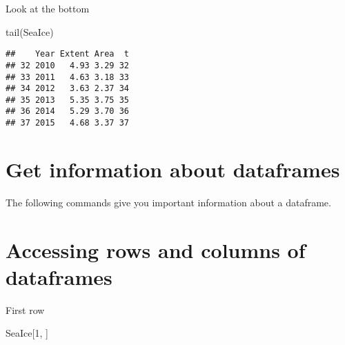 \documentclass[
]{book}
\newenvironment{Shaded}{\begin{snugshade}}{\end{snugshade}}
\newcommand{\DecValTok}[1]{\textcolor[rgb]{0.00,0.00,0.81}{#1}}
\newcommand{\FunctionTok}[1]{\textcolor[rgb]{0.00,0.00,0.00}{#1}}
\newcommand{\NormalTok}[1]{#1}
\newcommand{\SpecialCharTok}[1]{\textcolor[rgb]{0.00,0.00,0.00}{#1}}
\begin{document}
Look at the bottom

\begin{Shaded}
\begin{Highlighting}[]
\FunctionTok{tail}\NormalTok{(SeaIce)}
\end{Highlighting}
\end{Shaded}

\begin{verbatim}
##    Year Extent Area  t
## 32 2010   4.93 3.29 32
## 33 2011   4.63 3.18 33
## 34 2012   3.63 2.37 34
## 35 2013   5.35 3.75 35
## 36 2014   5.29 3.70 36
## 37 2015   4.68 3.37 37
\end{verbatim}

\hypertarget{get-information-about-dataframes}{%
\section{Get information about dataframes}\label{get-information-about-dataframes}}

The following commands give you important information about a dataframe.

\begin{Shaded}
\end{Shaded}

\hypertarget{accessing-rows-and-columns-of-dataframes}{%
\section{Accessing rows and columns of dataframes}\label{accessing-rows-and-columns-of-dataframes}}

First row

\begin{Shaded}
\begin{Highlighting}[]
\NormalTok{SeaIce[}\DecValTok{1}\NormalTok{, ]}
\end{Highlighting}
\end{Shaded}
\end{document}
